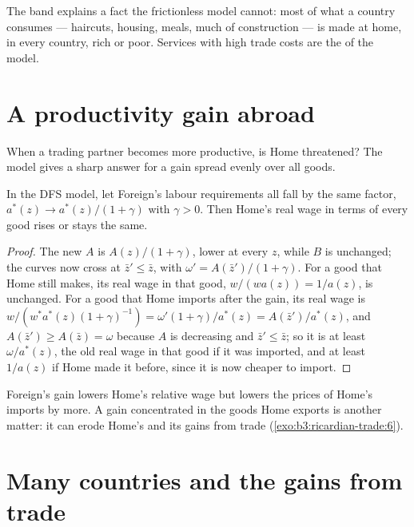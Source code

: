 The band explains a fact the frictionless model cannot: most of what a
country consumes --- haircuts, housing, meals, much of construction --- is made
at home, in every country, rich or poor. Services with high trade costs are the
 of the model.

\section{A productivity gain abroad}\label{sec:b3:ricardian-trade:gain}

When a trading partner becomes more productive, is Home threatened? The model
gives a sharp answer for a gain spread evenly over all goods.

\begin{proposition}\label{prop:b3:ricardian-trade:abroad}
In the DFS model, let Foreign's labour requirements all fall by the same factor,
$a^*(z) \to a^*(z)/(1 + \gamma)$ with $\gamma > 0$. Then Home's real wage in terms of
every good rises or stays the same.
\end{proposition}

\begin{proof}
The new $A$ is $A(z)/(1 + \gamma)$, lower at every $z$, while $B$ is unchanged; the
curves now cross at $\bar z' \le \bar z$, with $\omega' = A(\bar z')/(1 + \gamma)$. For a
good that Home still makes, its real wage in that good, $w/(w a(z)) = 1/a(z)$, is
unchanged. For a good that Home imports after the gain, its real wage is
$w/(w^* a^*(z)(1 + \gamma)^{-1}) = \omega'(1 + \gamma)/a^*(z) = A(\bar z')/a^*(z)$, and
$A(\bar z') \ge A(\bar z) = \omega$ because $A$ is decreasing and $\bar z' \le \bar z$; so it
is at least $\omega/a^*(z)$, the old real wage in that good if it was imported, and
at least $1/a(z)$ if Home made it before, since it is now cheaper to import.
\end{proof}

Foreign's gain lowers Home's relative wage but lowers the prices of Home's
imports by more. A gain concentrated in the goods Home exports is another matter:
it can erode Home's  and its gains from trade
(\cref{exo:b3:ricardian-trade:6}).

\section{Many countries and the gains from trade}\label{sec:b3:ricardian-trade:many}

